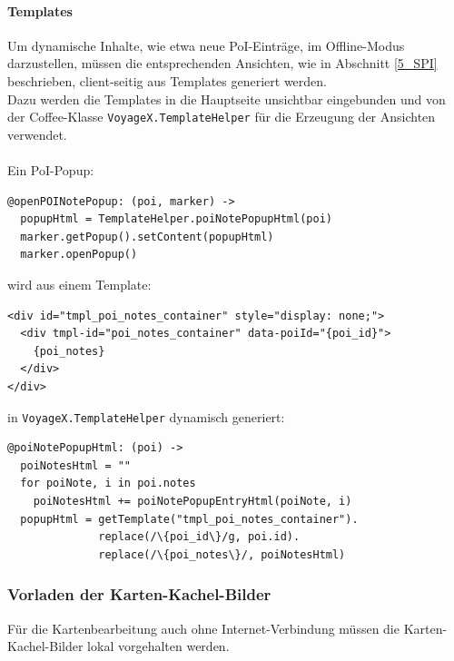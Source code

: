 \paragraph{Templates}
Um dynamische Inhalte, wie etwa neue PoI-Einträge, im Offline-Modus darzustellen, müssen die entsprechenden Ansichten, wie in Abschnitt \ref{5_SPI} beschrieben, client-seitig aus Templates generiert werden.\\
Dazu werden die Templates in die Hauptseite unsichtbar eingebunden und von der Coffee-Klasse  \texttt{VoyageX.TemplateHelper} für die Erzeugung der Ansichten verwendet.\\ \\
Ein PoI-Popup:
\lstset{language=Javascript}
\begin{lstlisting}[frame=single,numbers=none,xleftmargin=0pt]
@openPOINotePopup: (poi, marker) ->
  popupHtml = TemplateHelper.poiNotePopupHtml(poi)
  marker.getPopup().setContent(popupHtml)
  marker.openPopup()
\end{lstlisting}%
wird aus einem Template:
\lstset{language=Html}
\begin{lstlisting}[frame=single,numbers=none,xleftmargin=0pt]
<div id="tmpl_poi_notes_container" style="display: none;">
  <div tmpl-id="poi_notes_container" data-poiId="{poi_id}">
    {poi_notes}
  </div>
</div>
\end{lstlisting}%
in \texttt{VoyageX.TemplateHelper} dynamisch generiert:
\lstset{language=Javascript}
\begin{lstlisting}[frame=single,numbers=none,xleftmargin=0pt]
@poiNotePopupHtml: (poi) ->
  poiNotesHtml = ""
  for poiNote, i in poi.notes
    poiNotesHtml += poiNotePopupEntryHtml(poiNote, i)
  popupHtml = getTemplate("tmpl_poi_notes_container").
              replace(/\{poi_id\}/g, poi.id).
              replace(/\{poi_notes\}/, poiNotesHtml)
\end{lstlisting}%


\subsubsection{Vorladen der Karten-Kachel-Bilder}
Für die Kartenbearbeitung auch ohne Internet-Verbindung müssen die Karten-Kachel-Bilder
lokal vorgehalten werden.

